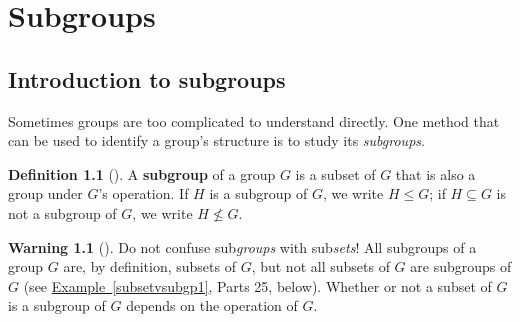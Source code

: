 \documentclass[10pt,]{book}
\newcommand{\terminology}[1]{\textbf{#1}}
\theoremstyle{plain}
\theoremstyle{definition}
\newtheorem{definition}[theorem]{Definition}
\theoremstyle{definition}
\newtheorem{warning}[theorem]{Warning}
\theoremstyle{definition}
\theoremstyle{definition}
\numberwithin{equation}{section}
\begin{document}
\chapter[{Subgroups}]{Subgroups}\label{subgps}
\typeout{************************************************}
\typeout{************************************************}
\section[{Introduction to subgroups}]{Introduction to subgroups}\label{subgpsintro}
Sometimes groups are too complicated to understand directly. One method that can be used to identify a group's structure is to study its \emph{subgroups}.%
\begin{definition}[{}]\label{definition-37}
\label{notation-52}
\label{notation-53}
A \terminology{subgroup} of a group \(G\) is a subset of \(G\) that is also a group under \(G\)'s operation. If \(H\) is a subgroup of \(G\), we write \(H \leq G\); if \(H\subseteq G\) is not a subgroup of \(G\), we write \(H\not\leq G\).%
\end{definition}
\begin{warning}[]\label{warning-14}
Do not confuse sub\emph{groups} with sub\emph{sets}! All subgroups of a group \(G\) are, by definition, subsets of \(G\), but not all subsets of \(G\) are subgroups of \(G\) (see \hyperref[subsetvsubgp1]{Example~\ref{subsetvsubgp1}}, Parts 2\textendash{}5, below). Whether or not a subset of \(G\) is a subgroup of \(G\) depends on the operation of \(G\).%
\end{warning}
\end{document}
